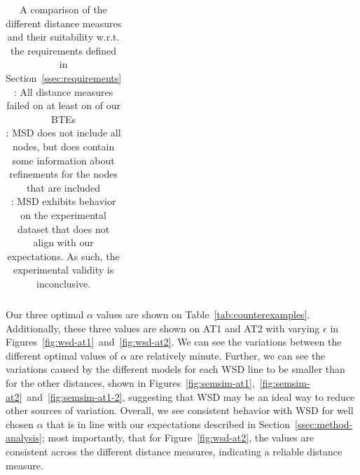 \begin{table}[t!]
{\begin{tabular}{@{}lcccc:ccc:cc@{}}
        \end{tabular}
    }
    \caption{A comparison of the different distance measures and their suitability w.r.t. the requirements defined in Section~\ref{ssec:requirements}\\
        \footnotesize
        \ReqFootOne: All distance measures failed on at least on of our BTEs\\
        \ReqFootTwo: MSD does not include all nodes, but does contain some information about refinements for the nodes that are included\\
        \ReqFootThree: MSD exhibits behavior on the experimental dataset that does not align with our expectations. As such, the experimental validity is inconclusive.
        \normalsize}
    \label{tab:requirmeent-suitability}
\end{table}


Our three optimal $\alpha$ values are shown on Table~\ref{tab:counterexamples}. Additionally, these three values are shown on AT1 and AT2 with varying $\epsilon$ in Figures~\ref{fig:wsd-at1}~and~\ref{fig:wsd-at2}. We can see the variations between the different optimal values of $\alpha$ are relatively minute. Further, we can see the variations caused by the different models for each WSD line to be smaller than for the other distances, shown in Figures~\ref{fig:semsim-at1},~\ref{fig:semsim-at2}~and~\ref{fig:semsim-at1-2}, suggesting that WSD may be an ideal way to reduce other sources of variation. Overall, we see consistent behavior with WSD for well chosen $\alpha$ that is in line with our expectations described in Section~\ref{ssec:method-analysis}; most importantly, that for Figure~\ref{fig:wsd-at2}, the values are consistent across the different distance measures, indicating a reliable distance measure.














